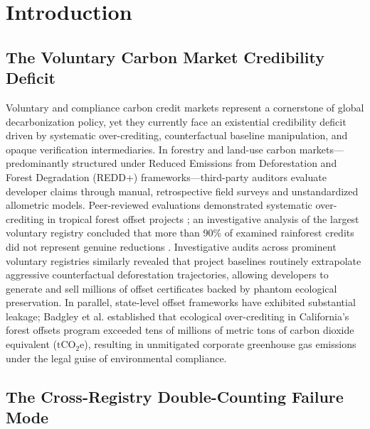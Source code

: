 \documentclass[preprint,12pt]{elsarticle}
\begin{document}
\section{Introduction}

\subsection{The Voluntary Carbon Market Credibility Deficit}

Voluntary and compliance carbon credit markets represent a cornerstone of global decarbonization policy, yet they currently face an existential credibility deficit driven by systematic over-crediting, counterfactual baseline manipulation, and opaque verification intermediaries. In forestry and land-use carbon markets—predominantly structured under Reduced Emissions from Deforestation and Forest Degradation (REDD+) frameworks—third-party auditors evaluate developer claims through manual, retrospective field surveys and unstandardized allometric models. Peer-reviewed evaluations demonstrated systematic over-crediting in tropical forest offset projects \cite{west2020overstated,west2023action,guizar2022evaluation}; an investigative analysis of the largest voluntary registry concluded that more than 90\% of examined rainforest credits did not represent genuine reductions \cite{greenfield2023revealed}. Investigative audits across prominent voluntary registries similarly revealed that project baselines routinely extrapolate aggressive counterfactual deforestation trajectories, allowing developers to generate and sell millions of offset certificates backed by phantom ecological preservation. In parallel, state-level offset frameworks have exhibited substantial leakage; Badgley et al. \cite{badgley2022systematic} established that ecological over-crediting in California's forest offsets program exceeded tens of millions of metric tons of carbon dioxide equivalent ($\text{tCO}_2\text{e}$), resulting in unmitigated corporate greenhouse gas emissions under the legal guise of environmental compliance.

\subsection{The Cross-Registry Double-Counting Failure Mode}
\end{document}
